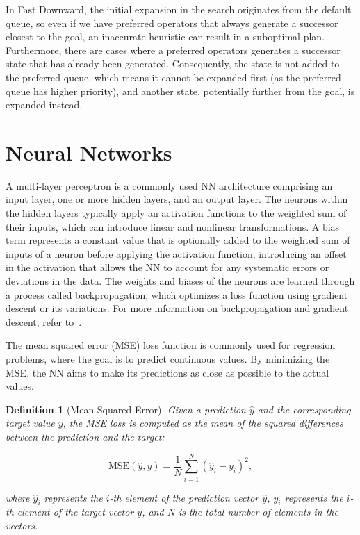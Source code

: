 \documentclass[ppgc,diss,english]{iiufrgs}
\newtheorem{definition}{Definition}
\begin{document}
In Fast Downward, the initial expansion in the search originates from the default queue, so even if we have preferred operators that always generate a successor closest to the goal, an inaccurate heuristic can result in a suboptimal plan. Furthermore, there are cases where a preferred operators generates a successor state that has already been generated. Consequently, the state is not added to the preferred queue, which means it cannot be expanded first (as the preferred queue has higher priority), and another state, potentially further from the goal, is expanded instead.

\section{Neural Networks}
\label{sec:background-neural-nets}

A multi-layer perceptron is a commonly used NN architecture comprising an input layer, one or more hidden layers, and an output layer. The neurons within the hidden layers typically apply an activation functions to the weighted sum of their inputs, which can introduce linear and nonlinear transformations. A bias term represents a constant value that is optionally added to the weighted sum of inputs of a neuron before applying the activation function, introducing an offset in the activation that allows the NN to account for any systematic errors or deviations in the data. The weights and biases of the neurons are learned through a process called backpropagation, which optimizes a loss function using gradient descent or its variations. For more information on backpropagation and gradient descent, refer to~\citet{Goodfellow.etal/2016}.

The mean squared error (MSE) loss function is commonly used for regression problems, where the goal is to predict continuous values. By minimizing the MSE, the NN aims to make its predictions as close as possible to the actual values.
\begin{definition}[Mean Squared Error]\label{def:mse}
Given a prediction $\hat{y}$ and the corresponding target value $y$, the MSE loss is computed as the mean of the squared differences between the prediction and the target:

$$\text{MSE}(\hat{y}, y) = \frac{1}{N} \sum_{i=1}^{N} (\hat{y}_i - y_i)^2,$$

where $\hat{y}_i$ represents the $i$-th element of the prediction vector $\hat{y}$, $y_i$ represents the $i$-th element of the target vector $y$, and $N$ is the total number of elements in the vectors.
\end{definition}
\end{document}
